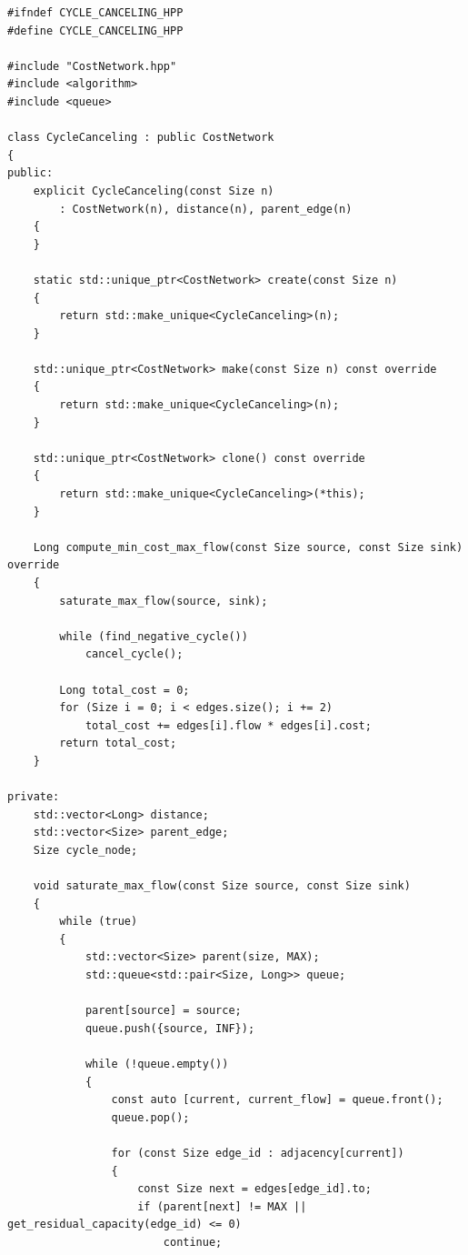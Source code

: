 \newpage

\label{ap:cycle_canceling}

\begin{lstlisting}[caption={Implementação em C++ do algoritmo \textit{Cycle Canceling}.}, label={lst:cycle_canceling}]
#ifndef CYCLE_CANCELING_HPP
#define CYCLE_CANCELING_HPP

#include "CostNetwork.hpp"
#include <algorithm>
#include <queue>

class CycleCanceling : public CostNetwork
{
public:
	explicit CycleCanceling(const Size n)
	    : CostNetwork(n), distance(n), parent_edge(n)
	{
	}

	static std::unique_ptr<CostNetwork> create(const Size n)
	{
		return std::make_unique<CycleCanceling>(n);
	}

	std::unique_ptr<CostNetwork> make(const Size n) const override
	{
		return std::make_unique<CycleCanceling>(n);
	}

	std::unique_ptr<CostNetwork> clone() const override
	{
		return std::make_unique<CycleCanceling>(*this);
	}

	Long compute_min_cost_max_flow(const Size source, const Size sink) override
	{
		saturate_max_flow(source, sink);

		while (find_negative_cycle())
			cancel_cycle();

		Long total_cost = 0;
		for (Size i = 0; i < edges.size(); i += 2)
			total_cost += edges[i].flow * edges[i].cost;
		return total_cost;
	}

private:
	std::vector<Long> distance;
	std::vector<Size> parent_edge;
	Size cycle_node;

	void saturate_max_flow(const Size source, const Size sink)
	{
		while (true)
		{
			std::vector<Size> parent(size, MAX);
			std::queue<std::pair<Size, Long>> queue;

			parent[source] = source;
			queue.push({source, INF});

			while (!queue.empty())
			{
				const auto [current, current_flow] = queue.front();
				queue.pop();

				for (const Size edge_id : adjacency[current])
				{
					const Size next = edges[edge_id].to;
					if (parent[next] != MAX || get_residual_capacity(edge_id) <= 0)
						continue;


\end{lstlisting}
